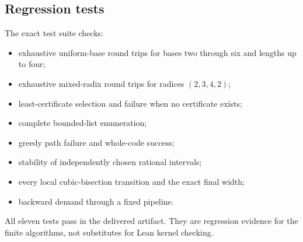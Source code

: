 \subsection{Regression tests}

The exact test suite checks:

\begin{itemize}
\item exhaustive uniform-base round trips for bases two through six and lengths
up to four;
\item exhaustive mixed-radix round trips for radices \((2,3,4,2)\);
\item least-certificate selection and failure when no certificate exists;
\item complete bounded-list enumeration;
\item greedy path failure and whole-code success;
\item stability of independently chosen rational intervals;
\item every local cubic-bisection transition and the exact final width;
\item backward demand through a fixed pipeline.
\end{itemize}

All eleven tests pass in the delivered artifact.  They are regression evidence
for the finite algorithms, not substitutes for Lean kernel checking.
